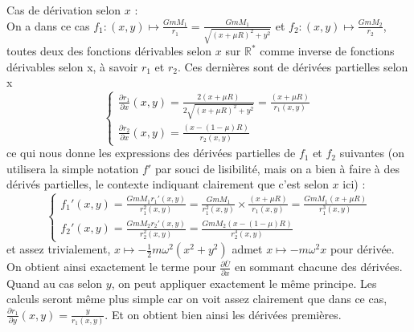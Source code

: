 \documentclass[20pt]{extarticle}
\theoremstyle{definition}
\theoremstyle{definition}
\begin{document}
	Cas de dérivation selon $x$ : \\
	On a dans ce cas $f_1 : (x,y) \longmapsto \frac{GmM_1}{r_1} = \frac{GmM_1}{\sqrt{(x+\mu R)^2 + y^2}}$ et $f_2 : (x,y) \longmapsto \frac{GmM_2}{r_2}$, toutes deux des fonctions dérivables selon $x$ sur $\mathbb{R}^*$ comme inverse de fonctions dérivables selon x, à savoir $r_1$ et $r_2$. Ces dernières sont de dérivées partielles selon x
	\begin{equation*}
		\begin{cases}
			\frac{\partial r_1}{\partial x}(x,y) = \frac{2(x+\mu R)}{2\sqrt{(x+\mu R)^2 + y^2}} = \frac{(x+\mu R)}{r_1(x,y)}
			\\
			\frac{\partial r_2}{\partial x}(x,y) = \frac{(x-(1-\mu)R)}{r_2(x,y)}
		\end{cases}
	\end{equation*}
	ce qui nous donne les expressions des dérivées partielles de $f_1$ et $f_2$ suivantes (on utilisera la simple notation $f'$ par souci de lisibilité, mais on a bien à faire à des dérivés partielles, le contexte indiquant clairement que c'est selon $x$ ici) :
	\begin{equation*}
		\begin{cases}
			f_1'(x,y) = \frac{GmM_1 r_1'(x,y)}{r_1^2(x,y)} = \frac{GmM_1}{r_1^2(x,y)} \times \frac{(x+\mu R)}{r_1(x,y)} = \frac{GmM_1(x+\mu R)}{r_1^3(x,y)}
			\\
			f_2'(x,y) = \frac{GmM_2 r_2'(x,y)}{r_2^2(x,y)} = \frac{GmM_2(x-(1-\mu)R)}{r_2^3(x,y)}
		\end{cases}
	\end{equation*}
	et assez trivialement, $x \longmapsto -\frac{1}{2}m\omega^2(x^2+y^2)$ admet $x \longmapsto -m\omega^2x$ pour dérivée. On obtient ainsi exactement le terme pour $\frac{\partial \bar{U}}{\partial x}$ en sommant chacune des dérivées.
	Quand au cas selon $y$, on peut appliquer exactement le même principe. Les calculs seront même plus simple car on voit assez clairement que dans ce cas, $\frac{\partial r_1}{\partial y}(x,y) = \frac{y}{r_1(x,y)}$.
	Et on obtient bien ainsi les dérivées premières.
	\\
	
\end{document}
